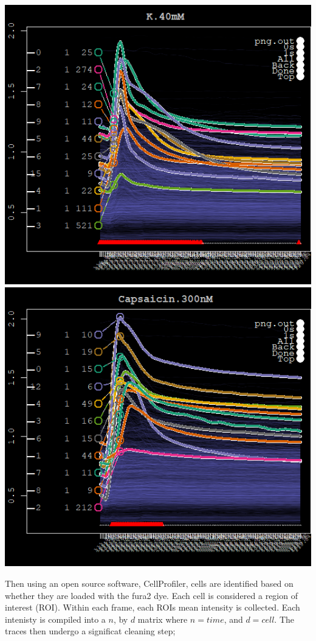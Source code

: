 \documentclass[11pt, fullpage,letterpaper]{article}
\begin{document}
\begin{enumerate}
\begin{enumerate}
\begin{center}
		\includegraphics[scale=.3]{K40_img.png}\includegraphics[scale=.3]{CAPS_img.png}
		\end{center}


	\end{enumerate}
\end{enumerate}
Then using an open source software, CellProfiler, cells are identified based on whether they are loaded with the fura2 dye. Each cell is considered a region of interest (ROI). Within each frame, each ROIs mean intensity is collected. Each intenisty is compiled into a $n$, by $d$ matrix where $n = time$, and $d = cell$. The traces then undergo a significat cleaning step;
\end{document}
